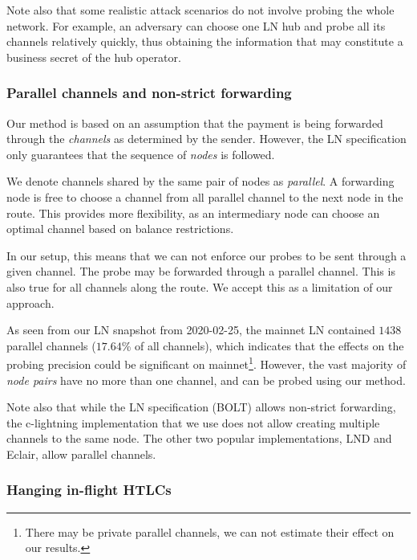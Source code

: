 Note also that some realistic attack scenarios do not involve probing the whole network.
For example, an adversary can choose one LN hub and probe all its channels relatively quickly, thus obtaining the information that may constitute a business secret of the hub operator.

\subsubsection*{Parallel channels and non-strict forwarding}

Our method is based on an assumption that the payment is being forwarded through the \textit{channels} as determined by the sender.
However, the LN specification only guarantees that the sequence of \textit{nodes} is followed.

We denote channels shared by the same pair of nodes as \textit{parallel}.
A forwarding node is free to choose a channel from all parallel channel to the next node in the route.
This provides more flexibility, as an intermediary node can choose an optimal channel based on balance restrictions.

In our setup, this means that we can not enforce our probes to be sent through a given channel.
The probe may be forwarded through a parallel channel.
This is also true for all channels along the route.
We accept this as a limitation of our approach.

As seen from our LN snapshot from 2020-02-25, the mainnet LN contained $1438$ parallel channels ($17.64$\% of all channels), which indicates that the effects on the probing precision could be significant on mainnet\footnote{There may be private parallel channels, we can not estimate their effect on our results.}.
However, the vast majority of \textit{node pairs} have no more than one channel, and can be probed using our method.

Note also that while the LN specification (BOLT) allows non-strict forwarding, the c-lightning implementation that we use does not allow creating multiple channels to the same node.
The other two popular implementations, LND and Eclair, allow parallel channels.

\subsubsection*{Hanging in-flight HTLCs}

